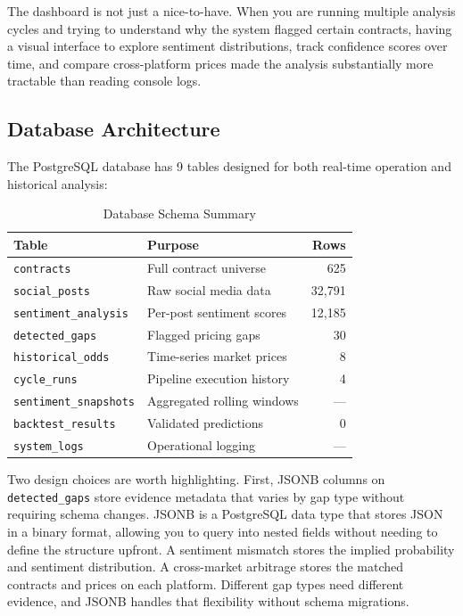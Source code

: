 \documentclass[conference]{IEEEtran}
\begin{document}
The dashboard is not just a nice-to-have. When you are running multiple analysis cycles and trying to understand why the system flagged certain contracts, having a visual interface to explore sentiment distributions, track confidence scores over time, and compare cross-platform prices made the analysis substantially more tractable than reading console logs.

\subsection{Database Architecture}

The PostgreSQL database has 9 tables designed for both real-time operation and historical analysis:

\begin{table}[H]
\centering
\caption{Database Schema Summary}
\begin{tabular}{@{}llr@{}}
\toprule
\textbf{Table} & \textbf{Purpose} & \textbf{Rows} \\
\midrule
\texttt{contracts} & Full contract universe & 625 \\
\texttt{social\_posts} & Raw social media data & 32,791 \\
\texttt{sentiment\_analysis} & Per-post sentiment scores & 12,185 \\
\texttt{detected\_gaps} & Flagged pricing gaps & 30 \\
\texttt{historical\_odds} & Time-series market prices & 8 \\
\texttt{cycle\_runs} & Pipeline execution history & 4 \\
\texttt{sentiment\_snapshots} & Aggregated rolling windows & --- \\
\texttt{backtest\_results} & Validated predictions & 0 \\
\texttt{system\_logs} & Operational logging & --- \\
\bottomrule
\end{tabular}
\label{tab:schema}
\end{table}

Two design choices are worth highlighting. First, JSONB columns on \texttt{detected\_gaps} store evidence metadata that varies by gap type without requiring schema changes. JSONB is a PostgreSQL data type that stores JSON in a binary format, allowing you to query into nested fields without needing to define the structure upfront. A sentiment mismatch stores the implied probability and sentiment distribution. A cross-market arbitrage stores the matched contracts and prices on each platform. Different gap types need different evidence, and JSONB handles that flexibility without schema migrations.
\end{document}
